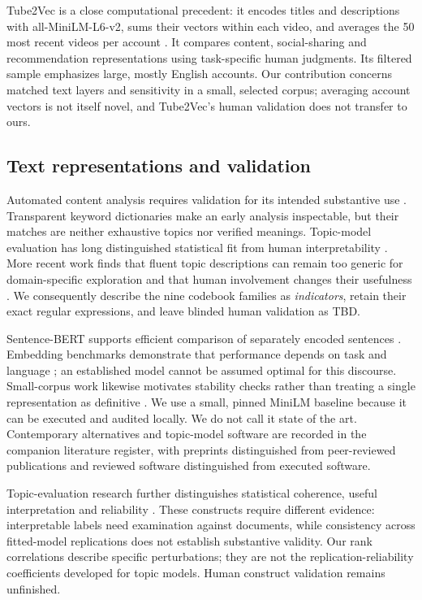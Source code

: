 Tube2Vec is a close computational precedent: it encodes titles and descriptions with all-MiniLM-L6-v2, sums their vectors within each video, and averages the 50 most recent videos per account \citep{boesinger2024tube2vec}. It compares content, social-sharing and recommendation representations using task-specific human judgments. Its filtered sample emphasizes large, mostly English accounts. Our contribution concerns matched text layers and sensitivity in a small, selected corpus; averaging account vectors is not itself novel, and Tube2Vec's human validation does not transfer to ours.

\subsection{Text representations and validation}
Automated content analysis requires validation for its intended substantive use \citep{grimmer2013text}. Transparent keyword dictionaries make an early analysis inspectable, but their matches are neither exhaustive topics nor verified meanings. Topic-model evaluation has long distinguished statistical fit from human interpretability \citep{chang2009reading}. More recent work finds that fluent topic descriptions can remain too generic for domain-specific exploration and that human involvement changes their usefulness \citep{li2025haystack}. We consequently describe the nine codebook families as \emph{indicators}, retain their exact regular expressions, and leave blinded human validation as TBD.

Sentence-BERT supports efficient comparison of separately encoded sentences \citep{reimers2019sentencebert}. Embedding benchmarks demonstrate that performance depends on task and language \citep{muennighoff2023mteb,enevoldsen2025mmteb}; an established model cannot be assumed optimal for this discourse. Small-corpus work likewise motivates stability checks rather than treating a single representation as definitive \citep{bloem2019consistency}. We use a small, pinned MiniLM baseline because it can be executed and audited locally. We do not call it state of the art. Contemporary alternatives and topic-model software are recorded in the companion literature register, with preprints distinguished from peer-reviewed publications and reviewed software distinguished from executed software.

Topic-evaluation research further distinguishes statistical coherence, useful interpretation and reliability \citep{doogan2021twaddle,hoyle2021incoherence,schroeder2025reliability}. These constructs require different evidence: interpretable labels need examination against documents, while consistency across fitted-model replications does not establish substantive validity. Our rank correlations describe specific perturbations; they are not the replication-reliability coefficients developed for topic models. Human construct validation remains unfinished.

